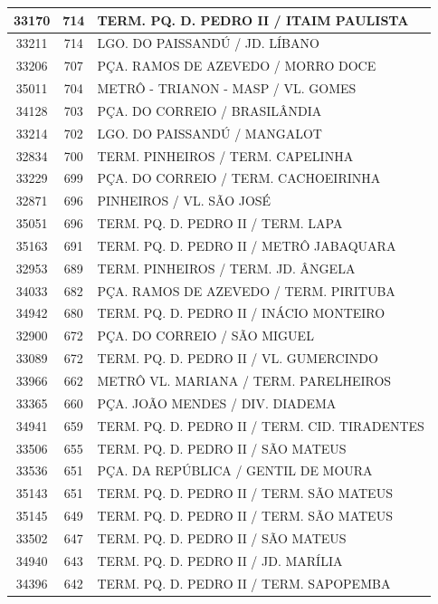 \documentclass[
	12pt,				%
	oneside,			%
	a4paper,			%
	english,			%
	brazil				%
	]{abntex2ppgsi}
\begin{document}
{{\begin{apendicesenv}
\begin{longtable}{c|c|p{7cm}}
 \hline 
33170 &	714 &	TERM. PQ. D. PEDRO II / ITAIM PAULISTA \\ 
 \hline 
33211 &	714 &	LGO. DO PAISSANDÚ / JD. LÍBANO \\ 
 \hline 
33206 &	707 &	PÇA. RAMOS DE AZEVEDO / MORRO DOCE \\ 
 \hline 
35011 &	704 &	METRÔ - TRIANON - MASP / VL. GOMES \\ 
 \hline 
34128 &	703 &	PÇA. DO CORREIO / BRASILÂNDIA \\ 
 \hline 
33214 &	702 &	LGO. DO PAISSANDÚ / MANGALOT \\ 
 \hline 
32834 &	700 &	TERM. PINHEIROS / TERM. CAPELINHA \\ 
 \hline 
33229 &	699 &	PÇA. DO CORREIO / TERM. CACHOEIRINHA \\ 
 \hline 
32871 &	696 &	PINHEIROS / VL. SÃO JOSÉ \\ 
 \hline 
35051 &	696 &	TERM. PQ. D. PEDRO II / TERM. LAPA \\ 
 \hline 
35163 &	691 &	TERM. PQ. D. PEDRO II / METRÔ JABAQUARA \\ 
 \hline 
32953 &	689 &	TERM. PINHEIROS / TERM. JD. ÂNGELA \\ 
 \hline 
34033 &	682 &	PÇA. RAMOS DE AZEVEDO / TERM. PIRITUBA \\ 
 \hline 
34942 &	680 &	TERM. PQ. D. PEDRO II / INÁCIO MONTEIRO \\ 
 \hline 
32900 &	672 &	PÇA. DO CORREIO / SÃO MIGUEL \\ 
 \hline 
33089 &	672 &	TERM. PQ. D. PEDRO II / VL. GUMERCINDO \\ 
 \hline 
33966 &	662 &	METRÔ VL. MARIANA / TERM. PARELHEIROS \\ 
 \hline 
33365 &	660 &	PÇA. JOÃO MENDES / DIV. DIADEMA \\ 
 \hline 
34941 &	659 &	TERM. PQ. D. PEDRO II / TERM. CID. TIRADENTES \\ 
 \hline 
33506 &	655 &	TERM. PQ. D. PEDRO II / SÃO MATEUS \\ 
 \hline 
33536 &	651 &	PÇA. DA REPÚBLICA / GENTIL DE MOURA \\ 
 \hline 
35143 &	651 &	TERM. PQ. D. PEDRO II / TERM. SÃO MATEUS \\ 
 \hline 
35145 &	649 &	TERM. PQ. D. PEDRO II / TERM. SÃO MATEUS \\ 
 \hline 
33502 &	647 &	TERM. PQ. D. PEDRO II / SÃO MATEUS \\ 
 \hline 
34940 &	643 &	TERM. PQ. D. PEDRO II / JD. MARÍLIA \\ 
 \hline 
34396 &	642 &	TERM. PQ. D. PEDRO II / TERM. SAPOPEMBA \\ 

\end{longtable}
\end{apendicesenv}}}
\end{document}
